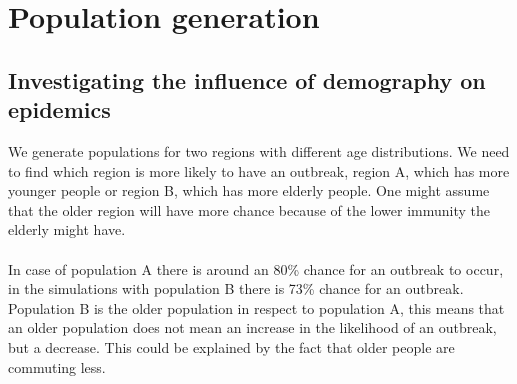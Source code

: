 \documentclass[runningheads]{llncs}
\begin{document}
\newpage
\noindent
\section{Population generation}

\subsection{Investigating the influence of demography on epidemics}
We generate populations for two regions with different age distributions. We need to find which region is more likely to have an outbreak, region A, which has more younger people or region B, which has more elderly people. One might assume that the older region will have more chance because of the lower immunity the elderly might have.
\\
\\
\noindent
In case of population A there is around an 80\% chance for an outbreak to occur, in the simulations with population B there is 73\% chance for an outbreak. Population B is the older population in respect to population A, this means that an older population does not mean an increase in the likelihood of an outbreak, but a decrease. This could be explained by the fact that older people are commuting less.
\end{document}
